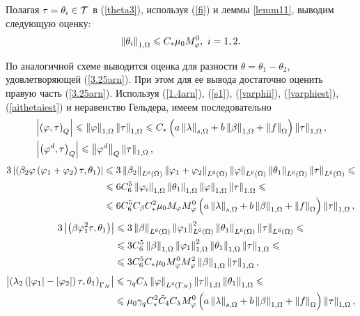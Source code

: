 Полагая $\tau =\theta_i \in {\mathcal{T}}$ в (\ref{theta3}), используя (\ref{fi}) и  леммы \ref{lemm11}, выводим следующую оценку:
\begin{equation}
	\label{aithetaiest}
	\left\Vert \theta_i \right\Vert_{1,\Omega} \leqslant C_{*} \mu_0 M_\varphi^0, ~ i=1, 2. 
\end{equation}

По аналогичной схеме выводится оценка для разности $\theta = \theta_1 - \theta_2$, удовлетворяющей (\ref{3.25arn}). При этом для ее вывода достаточно оценить правую часть (\ref{3.25arn}). Используя (\ref{1.4arn}), (\ref{s1}), (\ref{varphii}), (\ref{varphiest}), (\ref{aithetaiest}) и неравенство Гельдера, имеем последовательно
\[
	\begin{split}
		&\left\vert \left( \varphi, \tau \right)_Q \right\vert \leqslant \left\Vert \varphi \right\Vert_{1,\Omega} \left\Vert \tau \right\Vert_{1,\Omega} 
		\leqslant C_{*} \left( 
			a \left\Vert \lambda \right\Vert_{s,\Omega} + b \left\Vert \beta \right\Vert_{1,\Omega} + \left\Vert f \right\Vert_\Omega
		 \right)
		\left\Vert \tau \right\Vert_{1,\Omega}, \\
		&\left\vert \left( \varphi^d, \tau \right)_Q \right\vert \leqslant \left\Vert \varphi^d \right\Vert_Q \left\Vert \tau \right\Vert_{1,\Omega},
	\end{split}
\]
\[
	\begin{split}
		3 \left\vert  
			\left( \beta_2 \varphi \left( \varphi_1 + \varphi_2 \right) \tau, \theta_1 \right) 
		 \right\vert &\leqslant 
			3 \left\Vert \beta_2 \right\Vert_{L^6 (\Omega)} 
			\left\Vert \varphi_1 + \varphi_2 \right\Vert_{ L^6 (\Omega)} 
			\left\Vert \varphi \right\Vert_{ L^6 (\Omega)} 
			\left\Vert \theta_1 \right\Vert_{ L^6 (\Omega)} 
			\left\Vert \tau \right\Vert_{ L^6 (\Omega)} 
		\leqslant \\
		&\leqslant  
			6 C^5_6 
			\left\Vert \varphi_i \right\Vert_{1, \Omega} 
			\left\Vert \theta_1 \right\Vert_{1, \Omega} 
			\left\Vert \varphi \right\Vert_{1, \Omega} 
			\left\Vert \tau \right\Vert_{1, \Omega} 
		\leqslant \\
		&\leqslant
			6 C^5_6 C_\beta C^2_{*} 
			\mu_0 
			M_\varphi M_\varphi^0 
			\left( 
				a \left\Vert \lambda \right\Vert_{s,\Omega} 
				+ b \left\Vert \beta \right\Vert_{1,\Omega} 
				+ \left\Vert f \right\Vert_\Omega 
			 \right) 
			\left\Vert \tau \right\Vert_{1, \Omega},
	\end{split}
\]
\[
	\begin{split}
		3 \left\vert \left( \beta \varphi^2_1 \tau, \theta_1 \right) \right\vert &\leqslant 
			3 \left\Vert \beta \right\Vert_{L^6 (\Omega)} 
			\left\Vert \varphi_1 \right\Vert^2_{ L^6 (\Omega)} 
			\left\Vert \theta_1 \right\Vert_{ L^6 (\Omega)} 
			\left\Vert \tau \right\Vert_{ L^6 (\Omega)} 
		\leqslant \\
		&\leqslant 
			3 C_6^5 
			\left\Vert \beta \right\Vert_{1, \Omega} 
			\left\Vert \varphi_1 \right\Vert^2_{1, \Omega} 
			\left\Vert \theta_1 \right\Vert_{1, \Omega} 
			\left\Vert \tau \right\Vert_{1, \Omega} 
		\leqslant \\
		&\leqslant
			3 C_6^5 C_{*} 
			\mu_0 
			M_\varphi^0 M_\varphi^2 
			\left\Vert \beta \right\Vert_{1,\Omega} 
			\left\Vert \tau \right\Vert_{1, \Omega},
	\end{split}
\]
\[
	\begin{split}
		\left\vert 
			\left( \lambda_2 
				\left(  \left\vert \varphi_1 \right\vert - \left\vert \varphi_2 \right\vert  \right) 
				\tau, \theta_1
			 \right)_{\Gamma_N} 
		 \right\vert &\leqslant 
			\gamma_q C_\lambda 
			\left\Vert \varphi \right\Vert_{L^4(\Gamma_N)} 
			\left\Vert \tau \right\Vert_{1,\Omega}
			\left\Vert \theta_1 \right\Vert_{1,\Omega} 
		\leqslant \\
		&\leqslant 
			\mu_0 \gamma_q 
			C_{*}^2 \tilde C_4 
			C_\lambda M_\varphi^0 
			\left( 
				a \left\Vert \lambda \right\Vert_{s,\Omega} 
				+ b \left\Vert \beta \right\Vert_{1,\Omega} 
				+ \left\Vert f \right\Vert_\Omega
			 \right)
			\left\Vert \tau \right\Vert_{1,\Omega},
	\end{split}
\]
